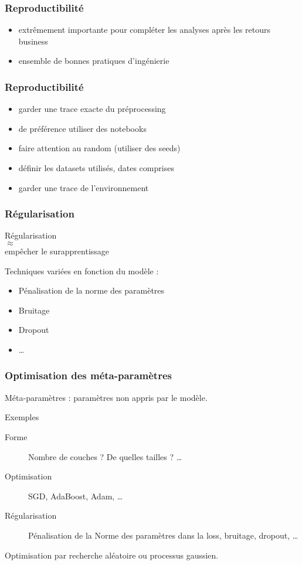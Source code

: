 \begin{frame}
  \frametitle{Reproductibilité}
  \begin{itemize}
  \item extrêmement importante pour compléter les analyses après les retours business
  \item ensemble de bonnes pratiques d'ingénierie
  \end{itemize}
\end{frame}

\begin{frame}
  \frametitle{Reproductibilité}
  \begin{itemize}[<+->]
  \item garder une trace exacte du préprocessing
  \item de préférence utiliser des notebooks
  \item faire attention au random (utiliser des seeds)
  \item définir les datasets utilisés, dates comprises
  \item garder une trace de l'environnement
  \end{itemize}
\end{frame}

\begin{frame}
  \frametitle{Régularisation}
  \begin{minipage}[l]{0.49\linewidth}
    \begin{center}
      Régularisation \\
      $\approx$\\
      empêcher le surapprentissage
    \end{center}
  \end{minipage}\hfill
  \begin{minipage}[l]{0.49\linewidth}
  \end{minipage}\hfill
  Techniques variées en fonction du modèle :
  \begin{itemize}
  \item Pénalisation de la norme des paramètres
  \item Bruitage
  \item Dropout
  \item …
  \end{itemize}
\end{frame}

\begin{frame}
  \frametitle{Optimisation des méta-paramètres}
  Méta-paramètres : paramètres \alert{non appris} par le modèle.
  \begin{exampleblock}{Exemples}
  \begin{description}
  \item[Forme] Nombre de couches ? De quelles tailles ? …
  \item [Optimisation] SGD, AdaBoost, Adam, …
  \item [Régularisation] Pénalisation de la Norme des paramètres dans la loss, bruitage, dropout, …
  \end{description}
  \end{exampleblock}
  Optimisation par recherche aléatoire ou processus gaussien.
\end{frame}

